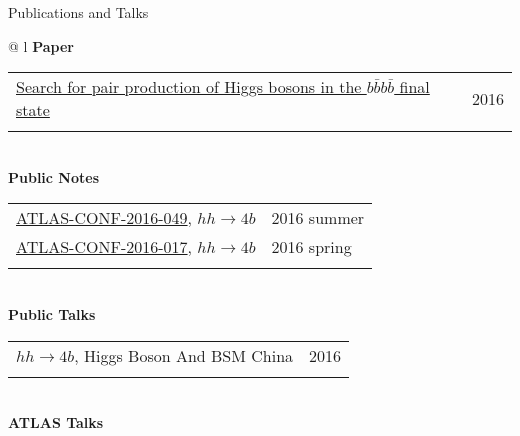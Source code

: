 \documentclass[letterpaper,11pt,oneside]{article}
\newcommand{\blue}[1]{\textcolor[rgb]{0,0,0.9}{#1}}
\begin{document}
\raggedright
 \Large{Publications and Talks} \\
 \normalsize
\begin{flushleft}
\hspace{1cm}
 \begin{tabular}{@{} l}
    \textbf{Paper} \\ 
    \begin{tabular}{@{} l l }
    \blue{\href{http://arxiv.org/abs/1606.04782}{Search for pair production of Higgs bosons in the $b\bar{b}b\bar{b}$ final state}} & 2016 \\
    \hspace{0.7\linewidth} & \hspace{0.1\linewidth} \\
     \end{tabular}
     \\
    \textbf{Public Notes} \\ 
    \begin{tabular}{@{} l l }
    \blue{\href{https://atlas.web.cern.ch/Atlas/GROUPS/PHYSICS/CONFNOTES/ATLAS-CONF-2016-049/}{ATLAS-CONF-2016-049}}, $hh\to4b$ & 2016 summer\\
    \blue{\href{https://atlas.web.cern.ch/Atlas/GROUPS/PHYSICS/CONFNOTES/ATLAS-CONF-2016-017/}{ATLAS-CONF-2016-017}}, $hh\to4b$ & 2016 spring\\
    \hspace{0.7\linewidth} & \hspace{0.1\linewidth} \\
     \end{tabular}
     \\
     \textbf{Public Talks} \\
     \begin{tabular}{@{} l l }
     \blue{\href{http://indico.ihep.ac.cn/event/5635/session/86/contribution/40}{$hh\to4b$}}, Higgs Boson And BSM China & 2016\\
    \hspace{0.7\linewidth} & \hspace{0.1\linewidth} \\
      \end{tabular}
     \\
     \textbf{ATLAS Talks} \\

\end{tabular}
\end{flushleft}
\end{document}
